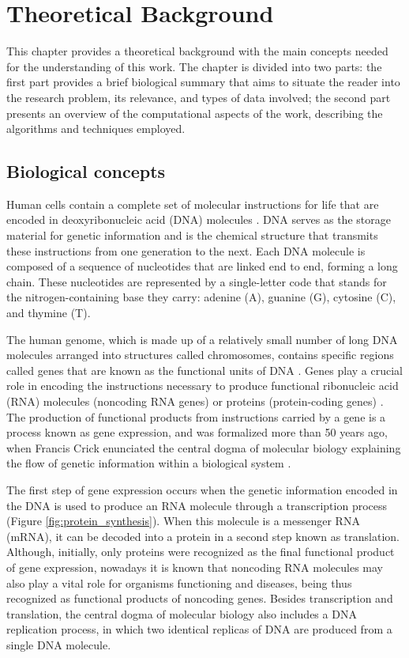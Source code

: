 
\chapter{Theoretical Background}
\label{sec:background}

This chapter provides a theoretical background with the main concepts needed for the understanding of this work. The chapter is divided into two parts: the first part provides a brief biological summary that aims to situate the reader into the research problem, its relevance, and types of data involved; the second part presents an overview of the computational aspects of the work, describing the algorithms and techniques employed. 

\section{Biological concepts}

Human cells contain a complete set of molecular instructions for life that are encoded in deoxyribonucleic acid (DNA) molecules \cite{alberts2002molecular}. DNA serves as the storage material for genetic information and is the chemical structure that transmits these instructions from one generation to the next. Each DNA molecule is composed of a sequence of nucleotides that are linked end to end, forming a long chain. These nucleotides are represented by a single-letter code that stands for the nitrogen-containing base they carry: adenine (A), guanine (G), cytosine (C), and thymine (T). 

The human genome, which is made up of a relatively small number of long DNA molecules arranged into structures called chromosomes, contains specific regions called genes that are known as the functional units of DNA \cite{simpson2022understanding}. Genes play a crucial role in encoding the instructions necessary to produce functional ribonucleic acid (RNA) molecules (noncoding RNA genes) or proteins (protein-coding genes) \cite{salzberg2018open}. The production of functional products from instructions carried by a gene is a process known as gene expression, and was formalized more than 50 years ago, when Francis Crick enunciated the central dogma of molecular biology explaining the flow of genetic information within a biological system \cite{crick1970central}.

The first step of gene expression occurs when the genetic information encoded in the DNA is used to produce an RNA molecule through a transcription process (Figure \ref{fig:protein_synthesis}). When this molecule is a messenger RNA (mRNA), it can be decoded into a protein in a second step known as translation. Although, initially, only proteins were recognized as the final functional product of gene expression, nowadays it is known that noncoding RNA molecules may also play a vital role for organisms functioning and diseases, being thus recognized as functional products of noncoding genes. Besides transcription and translation, the central dogma of molecular biology also includes a DNA replication process, in which two identical replicas of DNA are produced from a single DNA molecule.

